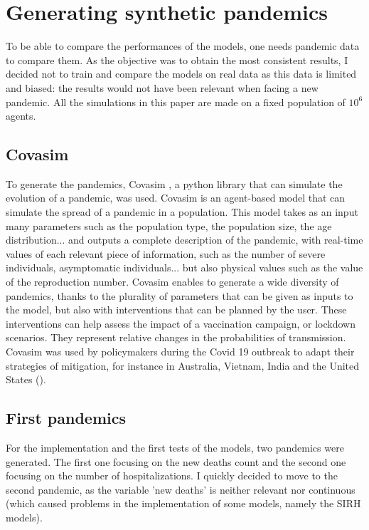 \section{Generating synthetic pandemics}



To be able to compare the performances of the models, one needs pandemic data to compare them. 
As the objective was to obtain the most consistent results, I decided not to train and compare the models on real data as this data is limited and biased: the results would not have been relevant when facing a new pandemic. 
All the simulations in this paper are made on a fixed population of $10^6$ agents. 

\subsection{Covasim}

To generate the pandemics,  Covasim \cite{kerr2021covasim}, a python library that can simulate the evolution of a pandemic, was used. 
Covasim is an agent-based model that can simulate the spread of a pandemic in a population. 
This model takes as an input many parameters such as the population type, the population size, the age distribution... and outputs a complete description of the pandemic, with real-time values of each relevant piece of information, such as the number of severe individuals, asymptomatic individuals... but also physical values such as the value of the reproduction number. 
Covasim enables to generate a wide diversity of pandemics, thanks to the plurality of parameters that can be given as inputs to the model, but also with interventions that can be planned by the user. 
These interventions can help assess the impact of a vaccination campaign, or lockdown scenarios. 
They represent relative changes in the probabilities of transmission. 
Covasim was used by policymakers during the Covid 19 outbreak to adapt their strategies of mitigation, for instance in Australia, Vietnam, India and the United States (\cite{kerr2021covasim}). 

\subsection{First pandemics}
\label{sec:first_pandemics}
For the implementation and the first tests of the models, two pandemics were generated. 
The first one focusing on the new deaths count and the second one focusing on the number of hospitalizations. 
I quickly decided to move to the second pandemic, as the variable 'new deaths' is neither relevant nor continuous (which caused problems in the implementation of some models, namely the SIRH models).


